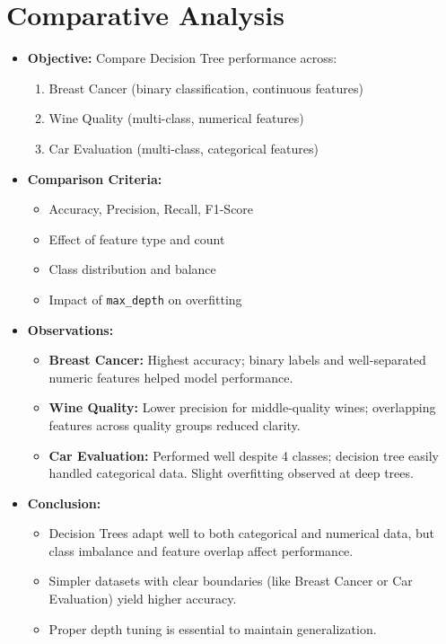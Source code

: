 \pagebreak
\section{Comparative Analysis}

\begin{itemize}
	\item \textbf{Objective:} Compare Decision Tree performance across:
	      \begin{enumerate}
		      \item Breast Cancer (binary classification, continuous features)
		      \item Wine Quality (multi-class, numerical features)
		      \item Car Evaluation (multi-class, categorical features)
	      \end{enumerate}

	\item \textbf{Comparison Criteria:}
	      \begin{itemize}
		      \item Accuracy, Precision, Recall, F1-Score
		      \item Effect of feature type and count
		      \item Class distribution and balance
		      \item Impact of \texttt{max\_depth} on overfitting
	      \end{itemize}

	\item \textbf{Observations:}
	      \begin{itemize}
		      \item \textbf{Breast Cancer:} Highest accuracy; binary labels and well-separated numeric features helped model performance.
		      \item \textbf{Wine Quality:} Lower precision for middle-quality wines; overlapping features across quality groups reduced clarity.
		      \item \textbf{Car Evaluation:} Performed well despite 4 classes; decision tree easily handled categorical data. Slight overfitting observed at deep trees.
	      \end{itemize}

	\item \textbf{Conclusion:}
	      \begin{itemize}
		      \item Decision Trees adapt well to both categorical and numerical data, but class imbalance and feature overlap affect performance.
		      \item Simpler datasets with clear boundaries (like Breast Cancer or Car Evaluation) yield higher accuracy.
		      \item Proper depth tuning is essential to maintain generalization.
	      \end{itemize}
\end{itemize}
